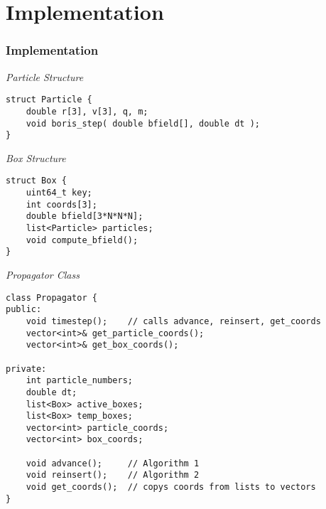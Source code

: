 \section{Implementation}
\begin{frame}[fragile]
    \frametitle{Implementation}

    \textit{Particle Structure}
    \begin{verbatim}
struct Particle {
    double r[3], v[3], q, m;
    void boris_step( double bfield[], double dt );
}
    \end{verbatim}

    \textit{Box Structure}
    \begin{verbatim}
struct Box {
    uint64_t key;
    int coords[3];
    double bfield[3*N*N*N];
    list<Particle> particles;
    void compute_bfield();
}
    \end{verbatim}

\end{frame}


\begin{frame}[fragile]

    \textit{Propagator Class}
    \begin{verbatim}
class Propagator {
public:
    void timestep();    // calls advance, reinsert, get_coords
    vector<int>& get_particle_coords();
    vector<int>& get_box_coords();

private:
    int particle_numbers;
    double dt;
    list<Box> active_boxes;
    list<Box> temp_boxes;
    vector<int> particle_coords;
    vector<int> box_coords;

    void advance();     // Algorithm 1
    void reinsert();    // Algorithm 2
    void get_coords();  // copys coords from lists to vectors
}
    \end{verbatim}

\end{frame}

